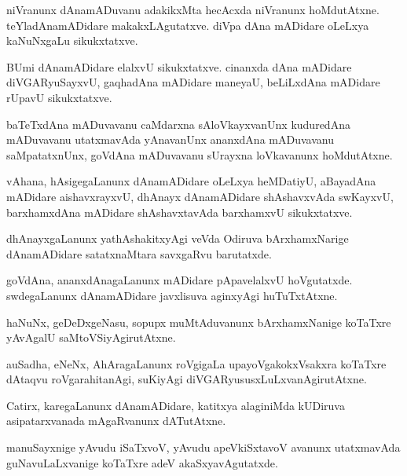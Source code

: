 \documentclass{article}
\begin{document}
\begin{mn}
niVranunx dAnamADuvanu adakikxMta hecAcxda niVranunx hoMdutAtxne. teYladAnamADidare 
makakxLAgutatxve. diVpa dAna mADidare oLeLxya kaNuNxgaLu sikukxtatxve.
\end{mn}

\begin{mn}
BUmi dAnamADidare elalxvU sikukxtatxve. cinanxda dAna mADidare diVGARyuSayxvU, gaqhadAna mADidare 
maneyaU, beLiLxdAna mADidare rUpavU sikukxtatxve.
\end{mn}

\begin{mn}
baTeTxdAna mADuvavanu caMdarxna sAloVkayxvanUnx kuduredAna mADuvavanu utatxmavAda yAnavanUnx 
ananxdAna mADuvavanu saMpatatxnUnx, goVdAna mADuvavanu sUrayxna loVkavanunx hoMdutAtxne.
\end{mn}

\begin{mn}
vAhana, hAsigegaLanunx dAnamADidare oLeLxya heMDatiyU, aBayadAna mADidare aishavxrayxvU, dhAnayx 
dAnamADidare shAshavxvAda swKayxvU, barxhamxdAna mADidare shAshavxtavAda barxhamxvU sikukxtatxve.
\end{mn}

\begin{mn}
dhAnayxgaLanunx yathAshakitxyAgi veVda Odiruva bArxhamxNarige dAnamADidare satatxnaMtara savxgaRvu 
barutatxde.
\end{mn}

\begin{mn}
goVdAna, ananxdAnagaLanunx mADidare pApavelalxvU hoVgutatxde. swdegaLanunx dAnamADidare javxlisuva 
aginxyAgi huTuTxtAtxne.
\end{mn}

\begin{mn}
haNuNx, geDeDxgeNasu, sopupx muMtAduvanunx bArxhamxNanige koTaTxre yAvAgalU saMtoVSiyAgirutAtxne.
\end{mn}

\begin{mn}
auSadha, eNeNx, AhAragaLanunx roVgigaLa upayoVgakokxVsakxra koTaTxre dAtaqvu roVgarahitanAgi, 
suKiyAgi diVGARyususxLuLxvanAgirutAtxne.
\end{mn}

\begin{mn}
Catirx, karegaLanunx dAnamADidare, katitxya alaginiMda kUDiruva asipatarxvanada mAgaRvanunx 
dATutAtxne.
\end{mn}

\begin{mn}
manuSayxnige yAvudu iSaTxvoV, yAvudu apeVkiSxtavoV avanunx utatxmavAda guNavuLaLxvanige 
koTaTxre adeV akaSxyavAgutatxde.
\end{mn}
\end{document}
